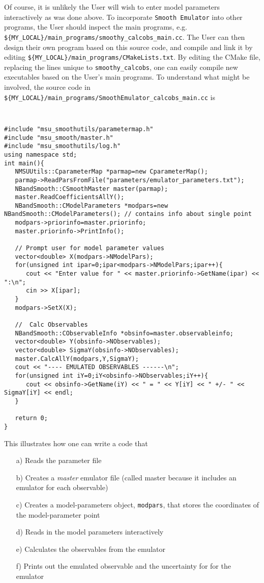 \documentclass[UserManual.tex]{subfiles}
\begin{document}
Of course, it is unlikely the User will wish to enter model parameters interactively as was done above. To incorporate {\tt Smooth Emulator} into other programs, the User should inspect the main programs, e.g. {\tt \$\{MY\_LOCAL\}/main\_programs/smoothy\_calcobs\_main.cc}. The User can then design their own program based on this source code, and compile and link it by editing {\tt \$\{MY\_LOCAL\}/main\_programs/CMakeLists.txt}. By editing the CMake file, replacing the lines unique to {\tt smoothy\_calcobs}, one can easily compile new executables based on the User's main programs. To understand what might be involved, the source code in {\tt \$\{MY\_LOCAL\}/main\_programs/SmoothEmulator\_calcobs\_main.cc} is
{\tt
\begin{verbatim}
#include "msu_smoothutils/parametermap.h"
#include "msu_smooth/master.h"
#include "msu_smoothutils/log.h"
using namespace std;
int main(){
   NMSUUtils::CparameterMap *parmap=new CparameterMap();
   parmap->ReadParsFromFile("parameters/emulator_parameters.txt");
   NBandSmooth::CSmoothMaster master(parmap);
   master.ReadCoefficientsAllY();
   NBandSmooth::CModelParameters *modpars=new NBandSmooth::CModelParameters(); // contains info about single point
   modpars->priorinfo=master.priorinfo;
   master.priorinfo->PrintInfo();

   // Prompt user for model parameter values
   vector<double> X(modpars->NModelPars);
   for(unsigned int ipar=0;ipar<modpars->NModelPars;ipar++){
      cout << "Enter value for " << master.priorinfo->GetName(ipar) << ":\n";
      cin >> X[ipar];
   }
   modpars->SetX(X);
   
   //  Calc Observables
   NBandSmooth::CObservableInfo *obsinfo=master.observableinfo;
   vector<double> Y(obsinfo->NObservables);
   vector<double> SigmaY(obsinfo->NObservables);
   master.CalcAllY(modpars,Y,SigmaY);
   cout << "---- EMULATED OBSERVABLES ------\n";
   for(unsigned int iY=0;iY<obsinfo->NObservables;iY++){
      cout << obsinfo->GetName(iY) << " = " << Y[iY] << " +/- " << SigmaY[iY] << endl;
   }

   return 0;
}
\end{verbatim}
}
This illustrates how one can write a code that 
\begin{itemize}\itemsep=0pt
\item[a)] Reads the parameter file
\item[b)] Creates a {\it master} emulator file (called master because it includes an emulator for each observable)
\item[c)] Creates a model-parameters object, {\tt modpars}, that stores the coordinates of the model-parameter point
\item[d)] Reads in the model parameters interactively
\item[e)] Calculates the observables from the emulator
\item[f)] Prints out the emulated observable and the uncertainty for for the emulator
\end{itemize}
\end{document}

